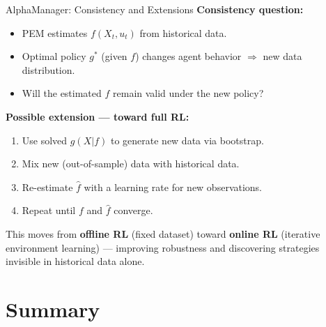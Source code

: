 \documentclass[10pt,english,aspectratio=169]{beamer}
\begin{document}
\begin{frame}{AlphaManager: Consistency and Extensions}
\textbf{Consistency question:}
\begin{itemize}
    \item PEM estimates $f(X_t, u_t)$ from historical data.
    \item Optimal policy $g^*$ (given $f$) changes agent behavior $\Rightarrow$ new data distribution.
    \item Will the estimated $f$ remain valid under the new policy?
\end{itemize}

\vspace{0.3cm}
\textbf{Possible extension --- toward full RL:}
\begin{enumerate}
    \item Use solved $g(X|f)$ to generate new data via bootstrap.
    \item Mix new (out-of-sample) data with historical data.
    \item Re-estimate $\hat{f}$ with a learning rate for new observations.
    \item Repeat until $f$ and $\hat{f}$ converge.
\end{enumerate}

\vspace{0.2cm}
This moves from \textbf{offline RL} (fixed dataset) toward \textbf{online RL} (iterative environment learning) --- improving robustness and discovering strategies invisible in historical data alone.
\end{frame}


\section{Summary}
\end{document}
